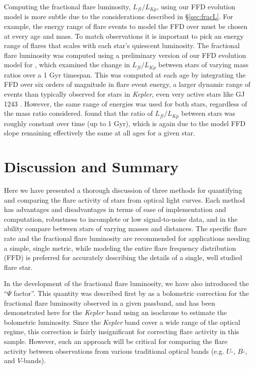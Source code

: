 \documentclass[preprint2]{aastex62}
\newcommand{\Kepler}{\textsl{Kepler}\xspace}
\begin{document}
Computing the fractional flare luminosity, $L_{fl}/L_{Kp}$, using our FFD evolution model is more subtle due to the considerations described in \S\ref{sec:fracL}. For example, the energy range of flare events to model the FFD over must be chosen at every age and mass. To match observations it is important to pick an energy range of flares that scales with each star's quiescent luminosity. The fractional flare luminosity was computed using a preliminary version of our FFD evolution model for \citet{clarke2018}, which examined the change in $L_{fl}/L_{Kp}$ between stars of varying mass ratios over a 1 Gyr timespan. This was computed at each age by integrating the FFD over six orders of magnitude in flare event energy, a larger dynamic range of events than typically observed for stars in \Kepler, even very active stars like GJ 1243 \citep{hawley2014}. However, the same range of energies was used for both stars, regardless of the mass ratio considered. \citet{clarke2018} found that the ratio of $L_{fl}/L_{Kp}$ between stars was roughly constant over time (up to 1 Gyr), which is again due to the model FFD slope remaining effectively the same at all ages for a given star.



\section{Discussion and Summary}
\label{sec:discussion}

Here we have presented a thorough discussion of three methods for quantifying and comparing the flare activity of stars from optical light curves. Each method has advantages and disadvantages in terms of ease of implementation and computation, robustness to incomplete or low signal-to-noise data, and in the ability compare between stars of varying masses and distances. The specific flare rate and the fractional flare luminosity are recommended for applications needing a simple, single metric, while modeling the entire flare frequency distribution (FFD) is preferred for accurately describing the details of a single, well studied flare star.

In the development of the fractional flare luminosity, we have also introduced the ``$\Psi$ factor''. This quantity was described first by \citet{lurie2015} as a bolometric correction for the fractional flare luminosity observed in a given passband, and has been demonstrated here for the \Kepler band using an isochrone to estimate the bolometric luminosity. Since the \Kepler band cover a wide range of the optical regime, this correction is fairly insignificant for correcting flare activity in this sample. However, such an approach will be critical for comparing the flare activity between observations from various traditional optical bands (e.g. $U$-, $B$-, and $V$-bands).
\end{document}
